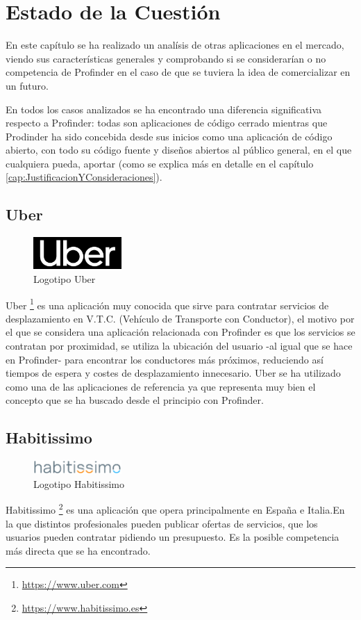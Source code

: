 \chapter{Estado de la Cuestión}
\label{cap:estadoDeLaCuestion}
En este capítulo se ha realizado un analísis de otras aplicaciones en el mercado, viendo sus características generales y comprobando si se considerarían o no competencia de Profinder en el caso de que se tuviera la idea de comercializar en un futuro. 

En todos los casos analizados se ha encontrado una diferencia significativa respecto a Profinder: todas son aplicaciones de código cerrado mientras que Prodinder ha sido concebida desde sus inicios como una aplicación de código abierto, con todo su código fuente y diseños abiertos al público general, en el que cualquiera pueda, aportar (como se explica más en detalle en el capítulo \ref{cap:JustificacionYConsideraciones}).
\section{Uber}
\begin{figure}[h]
	\centering
	\includegraphics[width = 0.3\textwidth]{Imagenes/Fuentes/logo_Uber.png}
	\caption{Logotipo Uber}
	\label{fig:uber_logo}
\end{figure}
Uber \footnote{\url{https://www.uber.com}} es una aplicación muy conocida que sirve para contratar servicios de desplazamiento en V.T.C. (Vehículo de Transporte con Conductor), el motivo por el que se considera una aplicación relacionada con Profinder es que los servicios se contratan por proximidad, se utiliza la ubicación del usuario -al igual que se hace en Profinder- para encontrar los conductores más próximos, reduciendo así tiempos de espera y costes de desplazamiento innecesario. Uber se ha utilizado como una de las aplicaciones de referencia ya que representa muy bien el concepto que se ha buscado desde el principio con Profinder.
\newpage
\section{Habitissimo}
\begin{figure}[h]
	\centering
	\includegraphics[width = 0.3\textwidth]{Imagenes/Fuentes/habitissimo_logo.jpg}
	\caption{Logotipo Habitissimo}
	\label{fig:habitissimo_logo}
\end{figure}
Habitissimo \footnote{\url{https://www.habitissimo.es}} es una aplicación que opera principalmente en España e Italia.En la que distintos profesionales pueden publicar ofertas de servicios, que los usuarios pueden contratar pidiendo un presupuesto. Es la posible competencia más directa que se ha encontrado. 

